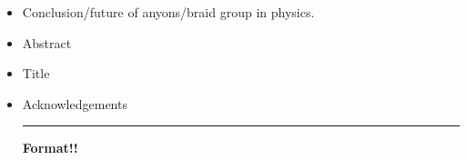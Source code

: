 \begin{itemize}
    \begin{center}\rule{.85\textwidth}{0.65pt}\end{center}
    
    \item Conclusion/future of anyons/braid group in physics.
    \item Abstract
    \item Title
    \item Acknowledgements
    
    \begin{center}\rule{.85\textwidth}{0.65pt}\end{center}
    
    \textbf{Format!!}
\end{itemize}
